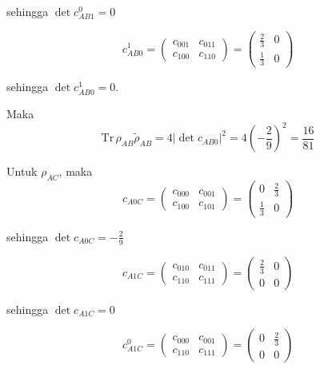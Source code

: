 \begin{enumerate}
	sehingga $\det c_{AB1}^0 = 0$
	
	\begin{equation}
		c_{AB0}^1=
		\begin{pmatrix}
			c_{001} & c_{011} \\
			c_{100} & c_{110}
		\end{pmatrix}=
		\begin{pmatrix}
			\frac{2}{3} & 0 \\
			\frac{1}{3} & 0
		\end{pmatrix}
	\end{equation}
	
	sehingga $\det c_{AB0}^1 = 0$.
	
	Maka
	\begin{equation}
		\mathrm{Tr}\,\rho_{AB}\tilde{\rho}_{AB}=4|\det c_{AB0}|^2=4(-\frac{2}{9})^2=\frac{16}{81}
	\end{equation}
	
	Untuk $\rho_{AC}$, maka
	\begin{equation}
		c_{A0C}=
		\begin{pmatrix}
			c_{000} & c_{001} \\
			c_{100} & c_{101}
		\end{pmatrix}=
		\begin{pmatrix}
			0 & \frac{2}{3} \\
			\frac{1}{3} & 0
		\end{pmatrix}
	\end{equation}
	
	sehingga $\det c_{A0C} = -\frac{2}{9}$
	
	\begin{equation}
		c_{A1C}=
		\begin{pmatrix}
			c_{010} & c_{011} \\
			c_{110} & c_{111}
		\end{pmatrix}=
		\begin{pmatrix}
			\frac{2}{3} & 0 \\
			0 & 0
		\end{pmatrix}
	\end{equation}
	
	sehingga $\det c_{A1C} = 0$
	
	\begin{equation}
		c_{A1C}^0=
		\begin{pmatrix}
			c_{000} & c_{001} \\
			c_{110} & c_{111}
		\end{pmatrix}=
		\begin{pmatrix}
			0 & \frac{2}{3} \\
			0 & 0
		\end{pmatrix}
	\end{equation}
	

\end{enumerate}
